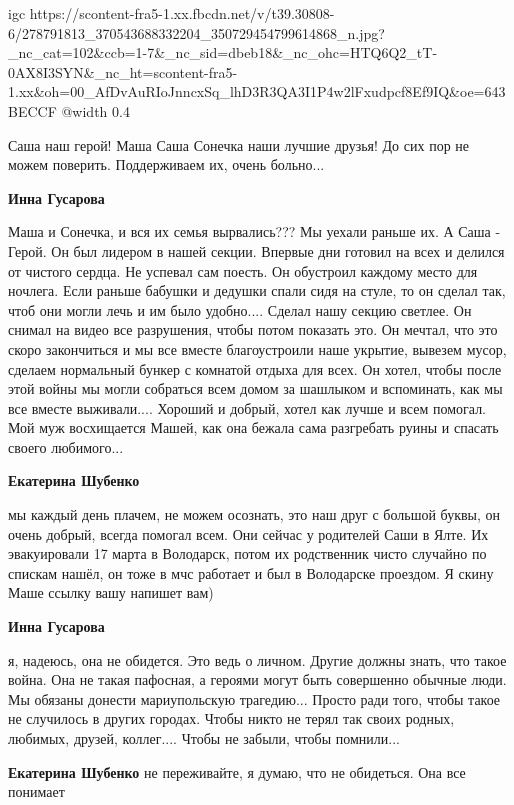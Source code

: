 
\ifcmt
  igc https://scontent-fra5-1.xx.fbcdn.net/v/t39.30808-6/278791813_370543688332204_350729454799614868_n.jpg?_nc_cat=102&ccb=1-7&_nc_sid=dbeb18&_nc_ohc=HTQ6Q2_tT-0AX8I3SYN&_nc_ht=scontent-fra5-1.xx&oh=00_AfDvAuRIoJnncxSq_lhD3R3QA3I1P4w2lFxudpcf8Ef9IQ&oe=643BECCF
	@width 0.4
\fi


Саша наш герой! Маша Саша Сонечка наши лучшие друзья! До сих пор не можем
поверить. Поддерживаем их, очень больно...

\begin{itemize} %
\textbf{Инна Гусарова} 

Маша и Сонечка, и вся их семья вырвались??? Мы уехали раньше их. А Саша -
Герой. Он был лидером в нашей секции. Впервые дни готовил на всех и делился от
чистого сердца. Не успевал сам поесть. Он обустроил каждому место для ночлега.
Если раньше бабушки и дедушки спали сидя на стуле, то он сделал так, чтоб они
могли лечь и им было удобно.... Сделал нашу секцию светлее. Он снимал на видео
все разрушения, чтобы потом показать это. Он мечтал, что это скоро закончиться
и мы все вместе благоустроили наше укрытие, вывезем мусор, сделаем нормальный
бункер с комнатой отдыха для всех. Он хотел, чтобы после этой войны мы могли
собраться всем домом за шашлыком и вспоминать, как мы все вместе выживали....
Хороший и добрый, хотел как лучше и всем помогал. Мой муж восхищается Машей,
как она бежала сама разгребать руины и спасать своего любимого...

\textbf{Екатерина Шубенко} 

мы каждый день плачем, не можем осознать, это наш друг с большой буквы, он
очень добрый, всегда помогал всем. Они сейчас у родителей Саши в Ялте. Их
эвакуировали 17 марта в Володарск, потом их родственник чисто случайно по
спискам нашёл, он тоже в мчс работает и был в Володарске проездом. Я скину Маше
ссылку вашу напишет вам)

\textbf{Инна Гусарова} 

я, надеюсь, она не обидется. Это ведь о личном. Другие должны знать, что такое
война. Она не такая пафосная, а героями могут быть совершенно обычные люди. Мы
обязаны донести мариупольскую трагедию... Просто ради того, чтобы такое не
случилось в других городах. Чтобы никто не терял так своих родных, любимых,
друзей, коллег.... Чтобы не забыли, чтобы помнили...

\textbf{Екатерина Шубенко} не переживайте, я думаю, что не обидеться. Она все понимает

\end{itemize} %

